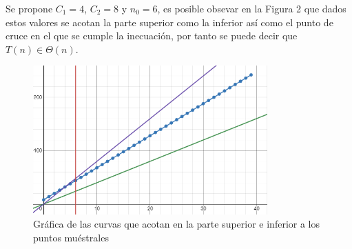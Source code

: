 \documentclass[12pt,twoside]{article}
\begin{document}
Se propone $C_{1}=4$, $C_{2}=8$ y $n_{0}=6$, es posible obsevar en la Figura 2 que dados estos valores se acotan la parte superior como la inferior as\'i como el punto de cruce en el que se cumple la inecuaci\'on, por tanto se puede decir que $T(n)\in \Theta(n)$.
\begin{figure}[H]
    \centering
    \includegraphics[width=9cm]{imagenes/grafica212.png}
    \caption{Gr\'afica de las curvas que acotan en la parte superior e inferior a los puntos mu\'estrales}
    \label{fig:my_label}
\end{figure}
\end{document}
